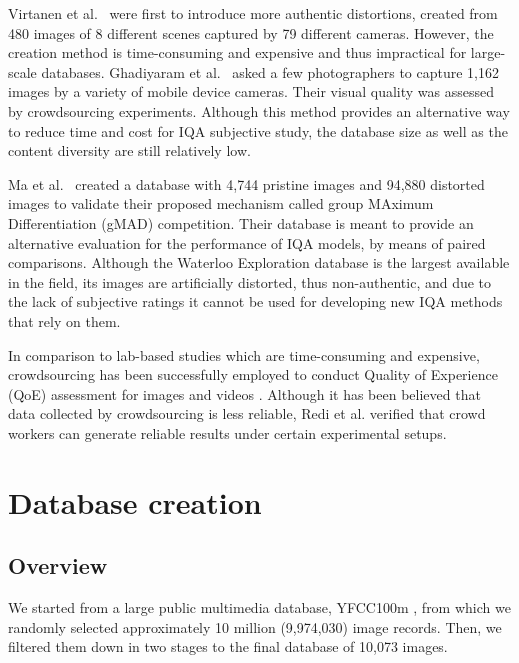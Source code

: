 \documentclass{article}
\begin{document}
Virtanen et al.\ \cite{virtanen2015cid2013} were first to introduce more authentic distortions, created from 480 images of 8 different scenes captured by 79 different cameras. However, the creation method is time-consuming and expensive and thus impractical for large-scale databases. Ghadiyaram et al.\ \cite{ghadiyaram:2016massive} asked a few photographers to capture 1,162 images by a variety of mobile device cameras. Their visual quality was assessed by crowdsourcing experiments. Although this method provides an alternative way to reduce time and cost for IQA subjective study, the database size as well as the content diversity are still relatively low. 

Ma et al.\ \cite{ma2016group} created a database with 4,744 pristine images and 94,880 distorted images 
to validate their proposed mechanism called group MAximum Differentiation (gMAD) competition. 
Their database is meant to provide an alternative evaluation for the performance of IQA models, by means of paired comparisons. Although the Waterloo Exploration database is the largest available in the field, its images are artificially distorted, thus non-authentic, and due to the lack of subjective ratings it cannot be used for developing new IQA methods that rely on them.

In comparison to lab-based studies which are time-consuming and expensive, crowdsourcing has been successfully employed to conduct Quality of Experience (QoE) assessment for images \cite{ghadiyaram:2016massive} and videos \cite{hosu:2017konstanz}.  Although it has been believed that data collected by crowdsourcing is less reliable, Redi et al. \cite{siahaan_reliable_2016} verified that crowd workers can generate reliable results under certain  experimental setups. 



\section{Database creation}
\label{sec:databcreate}

\subsection{Overview}

We started from a large public multimedia database, YFCC\-100m \cite{thomee:2016}, from which we randomly selected approximately 10 million (9,974,030) image records. Then, we filtered them down in two stages to the final database of 10,073 images.
\end{document}

